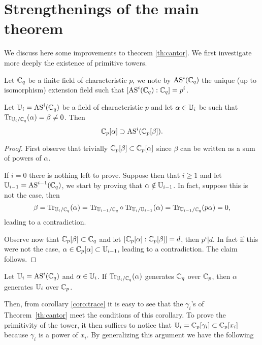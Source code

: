 \appendix

\section{Strengthenings of the main theorem}

We discuss here some improvements to theorem \ref{th:cantor}. We first
investigate more deeply the existence of primitive towers.

\begin{definition}
  Let $\mathbb{C}_q$ be a finite field of characteristic $p$, we note by
  $\operatorname{AS}^i(\mathbb{C}_q)$ the unique (up to isomorphism) extension field such
  that $[\operatorname{AS}^i(\mathbb{C}_q):\mathbb{C}_q]=p^i$.
\end{definition}

\begin{proposition}
  Let $\mathbb{U}_i = \operatorname{AS}^i(\mathbb{C}_q)$ be a field of characteristic $p$ and let
  $\alpha\in\mathbb{U}_i$ be such that $\operatorname{Tr}_{\mathbb{U}_i/\mathbb{C}_q}(\alpha) = \beta \ne 0$. Then
  \[\mathbb{C}_p[\alpha] \supset \operatorname{AS}^i(\mathbb{C}_p[\beta]) \text{.}\]
\end{proposition}
\begin{proof}
  First observe that trivially $\mathbb{C}_p[\beta]\subset\mathbb{C}_p[\alpha]$ since
  $\beta$ can be written as a sum of powers of $\alpha$.
  
  If $i=0$ there is nothing left to prove. Suppose then that $i\ge1$
  and let $\mathbb{U}_{i-1}=\operatorname{AS}^{i-1}(\mathbb{C}_q)$, we start by proving that
  $\alpha\notin\mathbb{U}_{i-1}$. In fact, suppose this is not the case, then
  \begin{equation*}
    \beta=\operatorname{Tr}_{\mathbb{U}_i/\mathbb{C}_q}(\alpha) =
    \operatorname{Tr}_{\mathbb{U}_{i-1}/\mathbb{C}_q}\circ\operatorname{Tr}_{\mathbb{U}_i/\mathbb{U}_{i-1}}(\alpha) =
    \operatorname{Tr}_{\mathbb{U}_{i-1}/\mathbb{C}_q}(p\alpha) = 0 \text{,}
  \end{equation*}
  leading to a contradiction.

  Observe now that $\mathbb{C}_p[\beta]\subset\mathbb{C}_q$ and let
  $[\mathbb{C}_p[\alpha]:\mathbb{C}_p[\beta]]=d$, then $p^i|d$. In fact if this were
  not the case, $\alpha\in\mathbb{C}_p[\alpha]\subset\mathbb{U}_{i-1}$, leading to a
  contradiction. The claim follows.
\end{proof}

\begin{corollary}
  Let $\mathbb{U}_i=\operatorname{AS}^i(\mathbb{C}_q)$ and $\alpha\in\mathbb{U}_i$. If
  $\operatorname{Tr}_{\mathbb{U}_i/\mathbb{C}_q}(\alpha)$ generates $\mathbb{C}_q$ over $\mathbb{C}_p$, then
  $\alpha$ generates $\mathbb{U}_i$ over $\mathbb{C}_p$.
\end{corollary}

Then, from corollary \ref{coro:trace} it is easy to see that the
$\gamma_i$'s of Theorem~\ref{th:cantor} meet the conditions of this
corollary. To prove the primitivity of the tower, it then suffices to
notice that $\mathbb{U}_i=\mathbb{C}_p[\gamma_i] \subset \mathbb{C}_p[x_i]$ because $\gamma_i$
is a power of $x_i$. By generalizing this argument we have the
following

